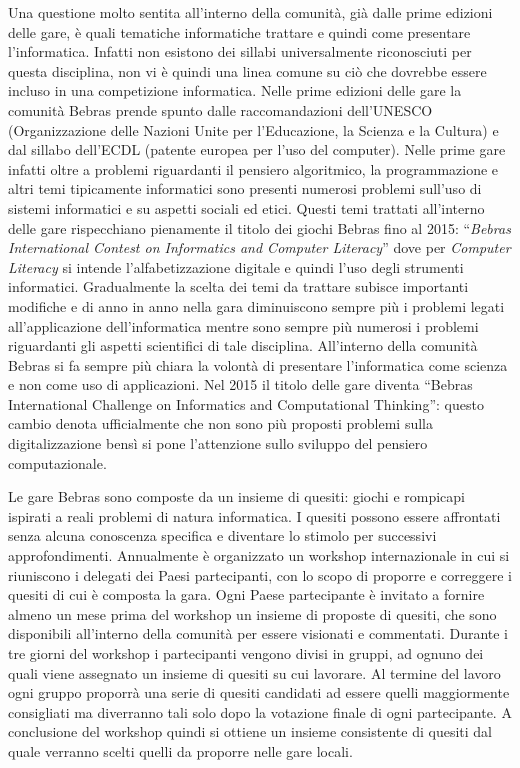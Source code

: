 \documentclass[12pt]{report}
\begin{document}
Una questione molto sentita all'interno della comunità, già dalle prime edizioni delle gare, è quali tematiche informatiche trattare e quindi come presentare l'informatica.
Infatti non esistono dei sillabi universalmente riconosciuti per questa disciplina, non vi è quindi una linea comune su ciò che dovrebbe essere incluso in una competizione informatica.
Nelle prime edizioni delle gare la comunità Bebras prende spunto dalle raccomandazioni dell'UNESCO (Organizzazione delle Nazioni Unite per l'Educazione, la Scienza e la Cultura) e dal sillabo dell'ECDL (patente europea per l'uso del computer). Nelle prime gare infatti oltre a problemi riguardanti il pensiero algoritmico, la programmazione e altri temi tipicamente informatici sono presenti numerosi problemi sull'uso di sistemi informatici e su aspetti sociali ed etici.
Questi temi trattati all'interno delle gare rispecchiano pienamente il titolo dei giochi Bebras fino al 2015: ``\textit{Bebras International Contest on Informatics and Computer Literacy}'' dove per \textit{Computer Literacy} si intende l'alfabetizzazione digitale e quindi l'uso degli strumenti informatici.
Gradualmente la scelta dei temi da trattare subisce importanti modifiche e di anno in anno nella gara diminuiscono sempre più i problemi legati all'applicazione dell'informatica mentre sono sempre più numerosi i problemi riguardanti gli aspetti scientifici di tale disciplina. All'interno della comunità Bebras si fa sempre più chiara la volontà di presentare l'informatica come scienza e non come uso di applicazioni. Nel 2015 il titolo delle gare diventa ``Bebras International Challenge on Informatics and Computational Thinking'': questo cambio denota ufficialmente che non sono più proposti problemi sulla digitalizzazione bensì si pone l'attenzione sullo sviluppo del pensiero computazionale.

Le gare Bebras sono composte da un insieme di quesiti: giochi e rompicapi ispirati a reali problemi di natura informatica. I quesiti possono essere affrontati senza alcuna conoscenza specifica e diventare lo stimolo per successivi approfondimenti.
Annualmente è organizzato un workshop internazionale in cui si riuniscono i delegati dei Paesi partecipanti, con lo scopo di proporre e correggere i quesiti di cui è composta la gara. 
Ogni Paese partecipante è invitato a fornire almeno un mese prima del workshop un insieme di proposte di quesiti, che sono disponibili all'interno della comunità per essere visionati e commentati. Durante i tre giorni del workshop i partecipanti vengono divisi in gruppi, ad ognuno dei quali viene assegnato un insieme di quesiti su cui lavorare. Al termine del lavoro ogni gruppo proporrà una serie di quesiti candidati ad essere quelli maggiormente consigliati ma diverranno tali solo dopo la votazione finale di ogni partecipante.
A conclusione del workshop quindi si ottiene un insieme consistente di quesiti dal quale verranno scelti quelli da proporre nelle gare locali.
\end{document}
